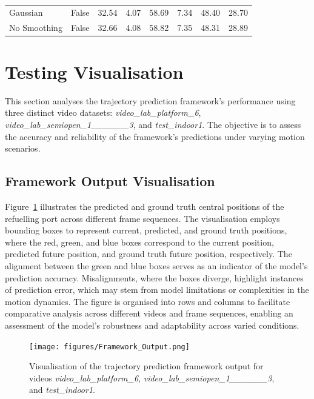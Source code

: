 \documentclass[12pt,oneside]{book} %
\begin{document}
\begin{table}[H]
\begin{adjustbox}{max width=\textwidth}
\begin{tabular}{llrrrrrr}
            Gaussian               & False        & 32.54             & 4.07              & 58.69             & 7.34              & 48.40              & 28.70              \\
            No Smoothing           & False        & 32.66             & 4.08              & 58.82             & 7.35              & 48.31              & 28.89              \\
            \bottomrule
        \end{tabular}
    \end{adjustbox}
    \label{tab:performance_metrics_video_lab_platform_6}
\end{table}

\newpage
\section{Testing Visualisation}
This section analyses the trajectory prediction framework’s performance using
three distinct video datasets: \textit{video\_lab\_platform\_6},
\textit{video\_lab\_semiopen\_1\_\_\_\_\_\_3}, and \textit{test\_indoor1}. The
objective is to assess the accuracy and reliability of the framework’s
predictions under varying motion scenarios.

\subsection{Framework Output Visualisation}
Figure~\ref{fig:trajectory-prediction-test-indoor1} illustrates the predicted
and ground truth central positions of the refuelling port across different
frame sequences. The visualisation employs bounding boxes to represent current,
predicted, and ground truth positions, where the red, green, and blue boxes
correspond to the current position, predicted future position, and ground truth
future position, respectively. The alignment between the green and blue boxes
serves as an indicator of the model’s prediction accuracy. Misalignments, where
the boxes diverge, highlight instances of prediction error, which may stem from
model limitations or complexities in the motion dynamics. The figure is
organised into rows and columns to facilitate comparative analysis across
different videos and frame sequences, enabling an assessment of the model's
robustness and adaptability across varied conditions.

\begin{figure}[H]
    \centering
    \texttt{[image: figures/Framework\_Output.png]}
    \caption{Visualisation of the trajectory prediction framework output for videos \textit{video\_lab\_platform\_6}, \textit{video\_lab\_semiopen\_1\_\_\_\_\_\_3}, and \textit{test\_indoor1}.}
    \label{fig:trajectory-prediction-test-indoor1}
\end{figure}
\end{document}
